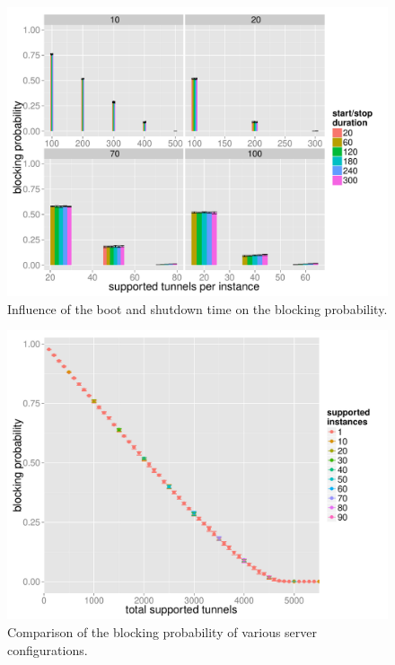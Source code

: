 \begin{figure}[htb]
  \centering
  \includegraphics[width=1.0\textwidth]{images/startstopduration-blockingprobability-barchart.pdf}
  \caption{Influence of the boot and shutdown time on the blocking probability.}
 \label{c4:fig:blockprob-startstop-barchart}
\end{figure}

\begin{figure}[htb]
  \centering
  \includegraphics[width=1.0\textwidth]{images/feasiblemultiserver-blockprob.pdf}
  \caption{Comparison of the blocking probability of various server configurations.}
 \label{c4:fig:blockprob-multiserver}
\end{figure}

